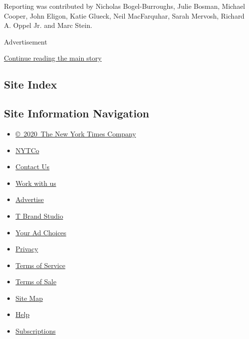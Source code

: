 Reporting was contributed by Nicholas Bogel-Burroughs, Julie Bosman,
Michael Cooper, John Eligon, Katie Glueck, Neil MacFarquhar, Sarah
Mervosh, Richard A. Oppel Jr. and Marc Stein.

Advertisement

\protect\hyperlink{after-bottom}{Continue reading the main story}

\hypertarget{site-index}{%
\subsection{Site Index}\label{site-index}}

\hypertarget{site-information-navigation}{%
\subsection{Site Information
Navigation}\label{site-information-navigation}}

\begin{itemize}
\tightlist
\item
  \href{https://help.nytimes3xbfgragh.onion/hc/en-us/articles/115014792127-Copyright-notice}{©~2020~The
  New York Times Company}
\end{itemize}

\begin{itemize}
\tightlist
\item
  \href{https://www.nytco.com/}{NYTCo}
\item
  \href{https://help.nytimes3xbfgragh.onion/hc/en-us/articles/115015385887-Contact-Us}{Contact
  Us}
\item
  \href{https://www.nytco.com/careers/}{Work with us}
\item
  \href{https://nytmediakit.com/}{Advertise}
\item
  \href{http://www.tbrandstudio.com/}{T Brand Studio}
\item
  \href{https://www.nytimes3xbfgragh.onion/privacy/cookie-policy\#how-do-i-manage-trackers}{Your
  Ad Choices}
\item
  \href{https://www.nytimes3xbfgragh.onion/privacy}{Privacy}
\item
  \href{https://help.nytimes3xbfgragh.onion/hc/en-us/articles/115014893428-Terms-of-service}{Terms
  of Service}
\item
  \href{https://help.nytimes3xbfgragh.onion/hc/en-us/articles/115014893968-Terms-of-sale}{Terms
  of Sale}
\item
  \href{https://spiderbites.nytimes3xbfgragh.onion}{Site Map}
\item
  \href{https://help.nytimes3xbfgragh.onion/hc/en-us}{Help}
\item
  \href{https://www.nytimes3xbfgragh.onion/subscription?campaignId=37WXW}{Subscriptions}
\end{itemize}
